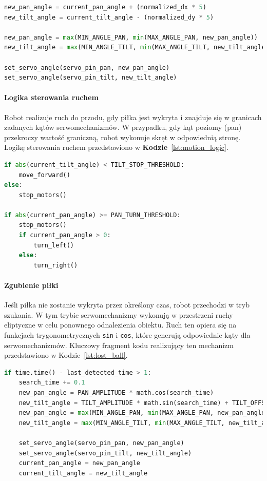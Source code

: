 \documentclass[a4paper,twoside,12pt]{book}
\begin{document}
\begin{lstlisting}[language=Python, caption={Algorytm sterowania serwomechanizmami.}, label={lst:servo_control}, captionpos=b]
new_pan_angle = current_pan_angle + (normalized_dx * 5)
new_tilt_angle = current_tilt_angle - (normalized_dy * 5)

new_pan_angle = max(MIN_ANGLE_PAN, min(MAX_ANGLE_PAN, new_pan_angle))
new_tilt_angle = max(MIN_ANGLE_TILT, min(MAX_ANGLE_TILT, new_tilt_angle))

set_servo_angle(servo_pin_pan, new_pan_angle)
set_servo_angle(servo_pin_tilt, new_tilt_angle)
\end{lstlisting}

\paragraph{Logika sterowania ruchem}
Robot realizuje ruch do przodu, gdy piłka jest wykryta i znajduje się w granicach zadanych kątów serwomechanizmów. W przypadku, gdy kąt poziomy (pan) przekroczy wartość graniczną, robot wykonuje skręt w odpowiednią stronę. Logikę sterowania ruchem przedstawiono w \textbf{Kodzie}~\ref{lst:motion_logic}.

\begin{lstlisting}[language=Python, caption={Logika sterowania ruchem robota.}, label={lst:motion_logic}, captionpos=b]
if abs(current_tilt_angle) < TILT_STOP_THRESHOLD:
    move_forward()
else:
    stop_motors()

if abs(current_pan_angle) >= PAN_TURN_THRESHOLD:
    stop_motors()
    if current_pan_angle > 0:
        turn_left()
    else:
        turn_right()
\end{lstlisting}

\paragraph{Zgubienie piłki}
Jeśli piłka nie zostanie wykryta przez określony czas, robot przechodzi w tryb szukania. W tym trybie serwomechanizmy wykonują w przestrzeni ruchy eliptyczne w celu ponownego odnalezienia obiektu. Ruch ten opiera się na funkcjach trygonometrycznych \texttt{sin} i \texttt{cos}, które generują odpowiednie kąty dla serwomechanizmów. Kluczowy fragment kodu realizujący ten mechanizm przedstawiono w Kodzie~\ref{lst:lost_ball}.

\begin{lstlisting}[language=Python, caption={Logika zgubienia piłki i ruchu eliptycznego.}, label={lst:lost_ball}, captionpos=b]
if time.time() - last_detected_time > 1:
    search_time += 0.1
    new_pan_angle = PAN_AMPLITUDE * math.cos(search_time)
    new_tilt_angle = TILT_AMPLITUDE * math.sin(search_time) + TILT_OFFSET
    new_pan_angle = max(MIN_ANGLE_PAN, min(MAX_ANGLE_PAN, new_pan_angle))
    new_tilt_angle = max(MIN_ANGLE_TILT, min(MAX_ANGLE_TILT, new_tilt_angle))

    set_servo_angle(servo_pin_pan, new_pan_angle)
    set_servo_angle(servo_pin_tilt, new_tilt_angle)
    current_pan_angle = new_pan_angle
    current_tilt_angle = new_tilt_angle
\end{lstlisting}
\end{document}
